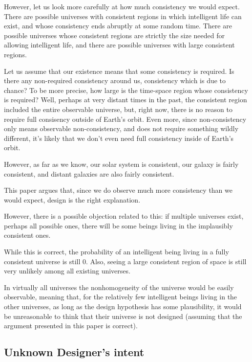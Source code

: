 \documentclass[a4paper
,draft
]{article}
\newcommand{\paper}[1]{paper}
\begin{document}
However, let us look more carefully at how much consistency we would expect.
There are possible universes with consistent regions in which
intelligent life can exist, and whose consistency ends abruptly at some
random time. There are possible universes whose consistent regions are
strictly the size needed for allowing intelligent life, and there are possible
universes with large consistent regions.

Let us assume that our existence means that some consistency is required.
Is there any non-required consistency around us, consistency which is due to
chance? To be more precise,
how large is the time-space region whose consistency is required? Well,
perhaps at very distant times in the past, the consistent region included
the entire observable universe, but, right now, there is no reason to require
full consisency outside of Earth's orbit. Even more, since non-consistency
only means
observable non-consistency, and does not require something wildly different,
it's likely that we don't even need full consistency inside of Earth's orbit.

However, as far as we know, our solar system is consistent, our galaxy is
fairly consistent, and distant galaxies are also fairly consistent.

This \paper{} argues that, since we do observe much more consistency
than we would expect, design is the right explanation.

However, there is a possible objection related to this: if multiple universes
exist, perhaps all possible ones, there will be some beings living in the
implausibly consistent ones.

While this is correct, the probability of an intelligent being
living in a fully consistent universe is still $0$.
Also, seeing a large consistent region of space is still very unlikely among
all existing universes.

In virtually all universes the nonhomogeneity of the universe would be
easily observable, meaning that, for the relatively few intelligent beings
living in the other universes, as long as the design hypothesis
has some plausibility, it would be unreasonable to think that
their universe is not designed (assuming that the argument presented in
this \paper{} is correct).

\subsection{Unknown Designer's intent}
\end{document}

